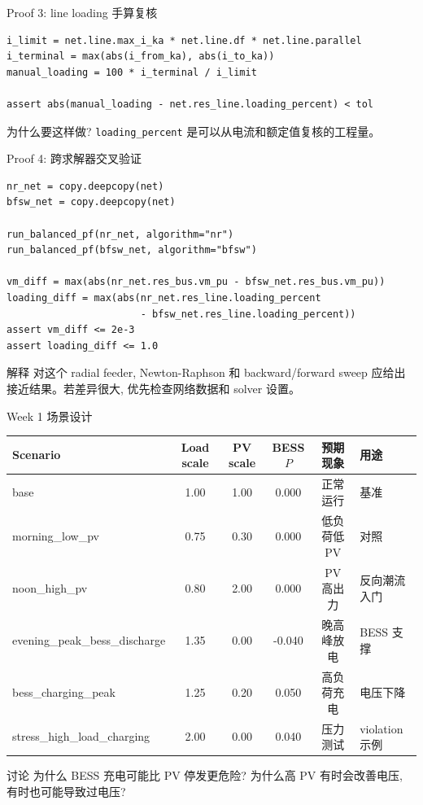 \documentclass[aspectratio=169,10pt]{ctexbeamer}
\newcommand{\code}[1]{\texttt{#1}}
\begin{document}
\begin{frame}[fragile]{Proof 3: line loading 手算复核}
\begin{lstlisting}
i_limit = net.line.max_i_ka * net.line.df * net.line.parallel
i_terminal = max(abs(i_from_ka), abs(i_to_ka))
manual_loading = 100 * i_terminal / i_limit

assert abs(manual_loading - net.res_line.loading_percent) < tol
\end{lstlisting}
\begin{block}{为什么要这样做?}
\code{loading\_percent} 是可以从电流和额定值复核的工程量。
\end{block}
\end{frame}

\begin{frame}[fragile]{Proof 4: 跨求解器交叉验证}
\begin{lstlisting}
nr_net = copy.deepcopy(net)
bfsw_net = copy.deepcopy(net)

run_balanced_pf(nr_net, algorithm="nr")
run_balanced_pf(bfsw_net, algorithm="bfsw")

vm_diff = max(abs(nr_net.res_bus.vm_pu - bfsw_net.res_bus.vm_pu))
loading_diff = max(abs(nr_net.res_line.loading_percent
                       - bfsw_net.res_line.loading_percent))
assert vm_diff <= 2e-3
assert loading_diff <= 1.0
\end{lstlisting}
\begin{block}{解释}
对这个 radial feeder, Newton-Raphson 和 backward/forward sweep 应给出接近结果。若差异很大, 优先检查网络数据和 solver 设置。
\end{block}
\end{frame}

\begin{frame}{Week 1 场景设计}
\begin{table}
\centering
\scriptsize
\begin{tabular}{lccccl}
\toprule
Scenario & Load scale & PV scale & BESS $P$ & 预期现象 & 用途 \\
\midrule
base & 1.00 & 1.00 & 0.000 & 正常运行 & 基准 \\
morning\_low\_pv & 0.75 & 0.30 & 0.000 & 低负荷低 PV & 对照 \\
noon\_high\_pv & 0.80 & 2.00 & 0.000 & PV 高出力 & 反向潮流入门 \\
evening\_peak\_bess\_discharge & 1.35 & 0.00 & -0.040 & 晚高峰放电 & BESS 支撑 \\
bess\_charging\_peak & 1.25 & 0.20 & 0.050 & 高负荷充电 & 电压下降 \\
stress\_high\_load\_charging & 2.00 & 0.00 & 0.040 & 压力测试 & violation 示例 \\
\bottomrule
\end{tabular}
\end{table}
\begin{alertblock}{讨论}
为什么 BESS 充电可能比 PV 停发更危险? 为什么高 PV 有时会改善电压, 有时也可能导致过电压?
\end{alertblock}
\end{frame}
\end{document}
